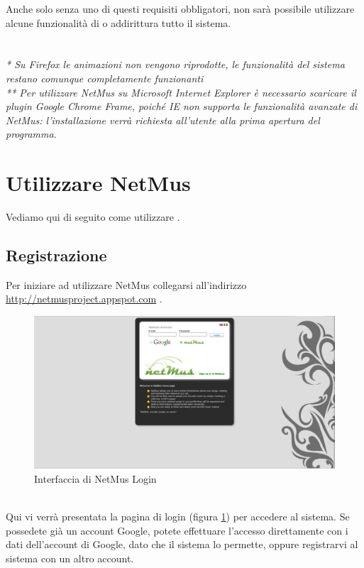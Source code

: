 Anche solo senza uno di questi requisiti obbligatori,
non sar\`a possibile utilizzare alcune funzionalit\`a di  o
addirittura tutto il sistema.\\
\\
\\

\emph{* Su Firefox le animazioni non vengono riprodotte, le funzionalit\`a del
sistema restano comunque completamente funzionanti}\\
\emph{** Per utilizzare NetMus su Microsoft Internet Explorer \`e
necessario scaricare il plugin Google Chrome Frame, poich\'e IE non supporta le
funzionalit\`a avanzate di NetMus: l'installazione verr\`a richiesta all'utente
alla prima apertura del programma}.

\newpage
\section{Utilizzare NetMus}
Vediamo qui di seguito come utilizzare .

\subsection{Registrazione}
Per iniziare ad utilizzare NetMus collegarsi all'indirizzo
\url{http://netmusproject.appspot.com} . \\
\begin{figure}[!htbp]
  \centering
  \includegraphics[width=14cm]{img/MU/login.png}
\caption{Interfaccia di NetMus Login}
\label{fig:login}
\end{figure}
\\
Qui vi verr\`a presentata la pagina di login (figura \ref{fig:login}) per
accedere al sistema. Se possedete gi\`a un account Google, potete effettuare
l'accesso direttamente con i dati dell'account di Google, dato che il sistema lo
permette, oppure registrarvi al sistema con un altro account.

